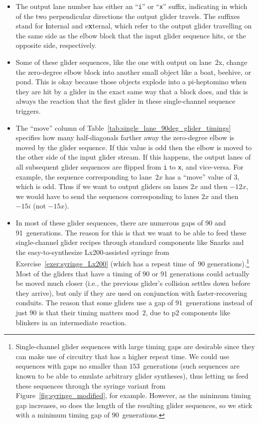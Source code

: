 \begin{itemize}
	\item The output lane number has either an ``\texttt{i}'' or ``\texttt{x}'' suffix, indicating in which of the two perpendicular directions the output glider travels. The suffixes stand for \textbf{i}nternal and e\textbf{x}ternal, which refer to the output glider travelling on the same side as the elbow block that the input glider sequence hits, or the opposite side, respectively.\smallskip 
	
	\item Some of these glider sequences, like the one with output on lane~2x, change the zero-degree elbow block into another small object like a boat, beehive, or pond. This is okay because those objects explode into a pi-heptomino when they are hit by a glider in the exact same way that a block does, and this is always the reaction that the first glider in these single-channel sequence triggers.\smallskip
	
	\item The ``move'' column of Table~\ref{tab:single_lane_90deg_glider_timings} specifies how many half-diagonals farther away the zero-degree elbow is moved by the glider sequence. If this value is odd then the elbow is moved to the other side of the input glider stream. If this happens, the output lanes of all subsequent glider sequences are flipped from \texttt{i} to \texttt{x}, and vice-versa. For example, the sequence corresponding to lane~$2x$ has a ``move'' value of $3$, which is odd. Thus if we want to output gliders on lanes $2x$ and then $-12x$, we would have to send the sequences corresponding to lanes $2x$ and then $-15i$ (not $-15x$).\smallskip
	
	\item In most of these glider sequences, there are numerous gaps of 90 and 91~generations. The reason for this is that we want to be able to feed these single-channel glider recipes through standard components like Snarks and the easy-to-synthesize Lx200-assisted syringe from Exercise~\ref{exer:syringe_Lx200} (which has a repeat time of~$90$ generations).\footnote{Single-channel glider sequences with large timing gaps are desirable since they can make use of circuitry that has a higher repeat time. We could use sequences with gaps no smaller than $153$~generations (such sequences are known to be able to emulate arbitrary glider syntheses), thus letting us feed these sequences through the syringe variant from Figure~\ref{fig:syringe_modified}, for example. However, as the minimum timing gap increases, so does the length of the resulting glider sequences, so we stick with a minimum timing gap of 90~generations.} Most of the gliders that have a timing of 90 or 91 generations could actually be moved much closer (i.e., the previous glider's collision settles down before they arrive), but only if they are used on conjunction with faster-recovering conduits. The reason that some gliders use a gap of $91$~generations instead of just $90$ is that their timing matters mod~$2$, due to p$2$ components like blinkers in an intermediate reaction.\smallskip
\end{itemize}


